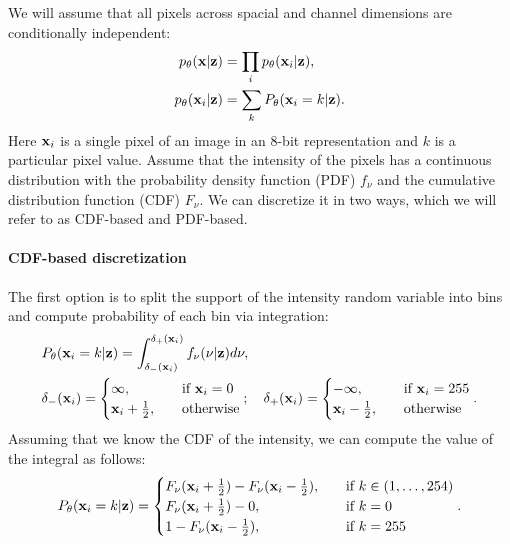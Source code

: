 We will assume that all pixels across spacial and channel dimensions are conditionally independent:
\begin{align}
    p_{\theta}({\mathbf{x}}|{\mathbf{z}}) &= \prod_i p_{\theta}({\mathbf{x}}_i|{\mathbf{z}}),\\
    p_{\theta}({\mathbf{x}}_i|{\mathbf{z}}) &= \sum_{k} P_{\theta}({\mathbf{x}}_i = k|{\mathbf{z}}).
\end{align}
Here ${\mathbf{x}}_i$ is a single pixel of an image in an 8-bit representation and $k$ is a particular pixel value. 
Assume that the intensity of the pixels has a continuous distribution with the probability density function (PDF) $f_{\nu}$ and the cumulative distribution function (CDF) $F_{\nu}$. We can discretize it in two ways, which we will refer to as CDF-based and PDF-based. 
\paragraph{CDF-based discretization}
The first option is to split the support of the intensity random variable into bins and compute probability of each bin via integration:
\begin{equation}\label{eq:intro_int_discr}
\begin{aligned}
    &P_{\theta}(\rvx_i = k|\rvz) = \int_{\delta_{-}(\rvx_i)}^{\delta_{+}(\rvx_i)} f_{\nu}(\nu|\rvz)d\nu,\\
    &\delta_{-}(\rvx_i) =
    \begin{cases}
        \infty,\quad &\text{if } \rvx_i = 0\\
        \rvx_i + \frac12,\quad&\text{otherwise}
    \end{cases};  \quad
    \delta_{+}(\rvx_i) =
    \begin{cases}
        -\infty,\quad &\text{if } \rvx_i = 255\\
        \rvx_i - \frac12,\quad&\text{otherwise}
    \end{cases}.
\end{aligned}
\end{equation}
Assuming that we know the CDF of the intensity, we can compute the value of the integral as follows:
\begin{equation}
    P_{\theta}({\mathbf{x}}_i = k|{\mathbf{z}}) =\begin{cases}
    F_{\nu}({\mathbf{x}}_i + \frac{1}{2}) - F_{\nu}({\mathbf{x}}_i - \frac{1}{2}),\quad &\text{if } k \in (1, \dots, 254) \\
    F_{\nu}({\mathbf{x}}_i + \frac{1}{2}) - 0,\quad &\text{if } k = 0 \\
    1 - F_{\nu}({\mathbf{x}}_i - \frac{1}{2}),\quad &\text{if } k = 255 \\
    \end{cases}.
\end{equation}
